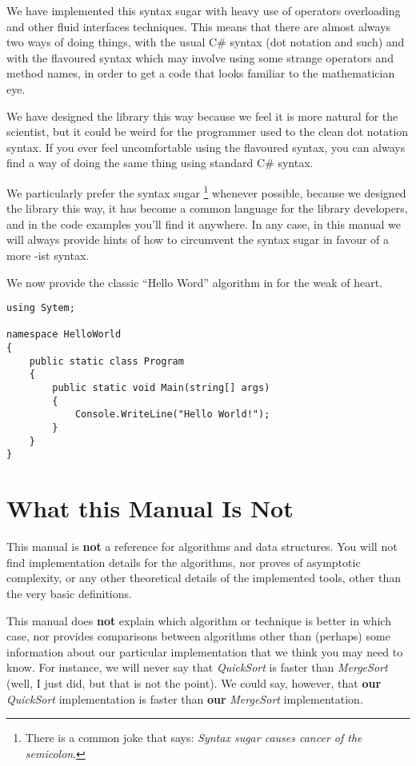 We have implemented this syntax sugar with heavy use of operators
overloading and other fluid interfaces techniques. This means 
that there are almost always two ways of doing things, with
the usual C\# syntax (dot notation and such) and with the flavoured
syntax which may involve using some strange operators and 
method names, in order to get a code that looks familiar
to the mathematician eye. 

We have designed the library this way because we feel it is
more natural for the scientist, but it could be weird for the
programmer used to the clean dot notation syntax. If you ever
feel uncomfortable using the flavoured syntax, you can
always find a way of doing the same thing using standard
C\# syntax. 

We particularly prefer the syntax sugar
\footnote{There is a common joke that says: \emph{Syntax sugar
causes cancer of the semicolon}.} whenever possible, because
we designed the library this way, it has become a
common language for the library developers, and in the code examples
you'll find it anywhere. In any case, in this manual we will
always provide hints of how to circumvent the syntax sugar
in favour of a more \cs-ist syntax.

We now provide the classic ``Hello Word'' algorithm in \cs for
the weak of heart.\label{listing:hello-world}

\begin{verbatim}
using Sytem;

namespace HelloWorld
{
    public static class Program
    {
        public static void Main(string[] args)
        {
            Console.WriteLine("Hello World!");        
        }    
    }
}
\end{verbatim}

\section*{What this Manual Is Not}

This manual is \textbf{not} a reference for algorithms and
data structures. You will not find implementation details for the
algorithms, nor proves of asymptotic complexity, or any other
theoretical details of the implemented tools, other than the very
basic definitions.

This manual does \textbf{not} explain which algorithm or technique
is better in which case, nor provides comparisons between algorithms 
other than (perhaps) some information about our particular implementation
that we think you may need to know. For instance, we will never say
that \emph{QuickSort} is faster than \emph{MergeSort} (well, I just did, but
that is not the point). We could say, however, that \textbf{our} \emph{QuickSort}
implementation is faster than \textbf{our} \emph{MergeSort} implementation.


